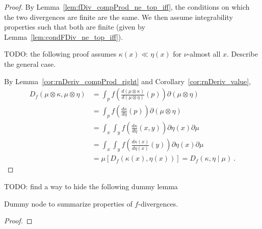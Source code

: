 \begin{proof} \leanok
{}
By Lemma~\ref{lem:fDiv_compProd_ne_top_iff}, the conditions on which the two divergences are finite are the same. We then assume integrability properties such that both are finite (given by Lemma~\ref{lem:condFDiv_ne_top_iff}).

TODO: the following proof assumes $\kappa(x) \ll \eta(x)$ for $\nu$-almost all $x$. Describe the general case.

By Lemma~\ref{cor:rnDeriv_compProd_right} and Corollary~\ref{cor:rnDeriv_value},
\begin{align*}
D_f(\mu \otimes \kappa, \mu \otimes \eta)
&= \int_{p} f\left(\frac{d (\mu \otimes \kappa)}{d (\mu \otimes \eta)}(p)\right) \partial(\mu \otimes \eta)
\\
&= \int_{p} f\left(\frac{d \kappa}{d \eta}(p)\right) \partial(\mu \otimes \eta)
\\
&= \int_x \int_y f\left(\frac{d \kappa}{d \eta}(x, y)\right) \partial \eta(x) \partial \mu
\\
&= \int_x \int_y f\left(\frac{d \kappa(x)}{d \eta(x)}(y)\right) \partial \eta(x) \partial \mu
\\
&= \mu\left[D_f(\kappa(x), \eta(x))\right]
= D_f(\kappa, \eta \mid \mu)
\: .
\end{align*}
\end{proof}




TODO: find a way to hide the following dummy lemma
\begin{lemma}
  \label{lem:fDiv_properties}
  \leanok
  Dummy node to summarize properties of $f$-divergences.
\end{lemma}

\begin{proof}\leanok
{}
\end{proof}









